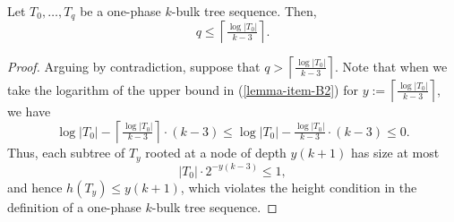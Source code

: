\documentclass[kpfonts]{patmorin}
\newcommand{\pnote}[1]{\ \newline\noindent\fcolorbox{red}{yellow}{\begin{minipage}{\textwidth}#1\end{minipage}}}
\newcommand{\Oh}{\mathcal{O}}
\let\leq\leqslant
\let\geq\geqslant
\newcommand{\itemref}[1]{(\ref{#1})}
\begin{document}
\begin{cor}
Let $T_0,\ldots,T_{q}$ be a one-phase $k$-bulk tree sequence.
Then,
\[
q \leq \left\lceil\tfrac{\log|T_0|}{k-3}\right\rceil.
\]
\end{cor}
\begin{proof}
Arguing by contradiction, suppose that $q > \left\lceil\tfrac{\log|T_0|}{k-3}\right\rceil$.
Note that when we take the logarithm of the upper bound in \itemref{lemma-item-B2} for $y:=\left\lceil\tfrac{\log|T_0|}{k-3}\right\rceil$,  we have
\[
\log|T_0| - \left\lceil\tfrac{\log|T_0|}{k-3}\right\rceil\cdot(k-3)
\leq \log|T_0|-\tfrac{\log|T_0|}{k-3}\cdot(k-3)
\leq0.
\]
Thus, each subtree of $T_{y}$ rooted at a node of depth $y(k+1)$ has size at most
\[
|T_0|\cdot2^{-y(k-3)} \leq 1,
\]
and hence $h(T_y) \leq y(k+1)$, which violates the height condition in the definition of a one-phase $k$-bulk tree sequence.
\end{proof}
\end{document}
